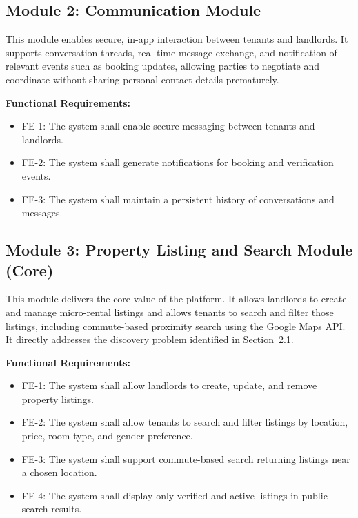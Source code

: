 \subsection{Module 2: Communication Module}

This module enables secure, in-app interaction between tenants and landlords. It supports conversation threads, real-time message exchange, and notification of relevant events such as booking updates, allowing parties to negotiate and coordinate without sharing personal contact details prematurely.

\textbf{Functional Requirements:}

\begin{itemize}
    \item FE-1: The system shall enable secure messaging between tenants and landlords.
    \item FE-2: The system shall generate notifications for booking and verification events.
    \item FE-3: The system shall maintain a persistent history of conversations and messages.
\end{itemize}

\subsection{Module 3: Property Listing and Search Module (Core)}

This module delivers the core value of the platform. It allows landlords to create and manage micro-rental listings and allows tenants to search and filter those listings, including commute-based proximity search using the Google Maps API. It directly addresses the discovery problem identified in Section~2.1.

\textbf{Functional Requirements:}

\begin{itemize}
    \item FE-1: The system shall allow landlords to create, update, and remove property listings.
    \item FE-2: The system shall allow tenants to search and filter listings by location, price, room type, and gender preference.
    \item FE-3: The system shall support commute-based search returning listings near a chosen location.
    \item FE-4: The system shall display only verified and active listings in public search results.
\end{itemize}

